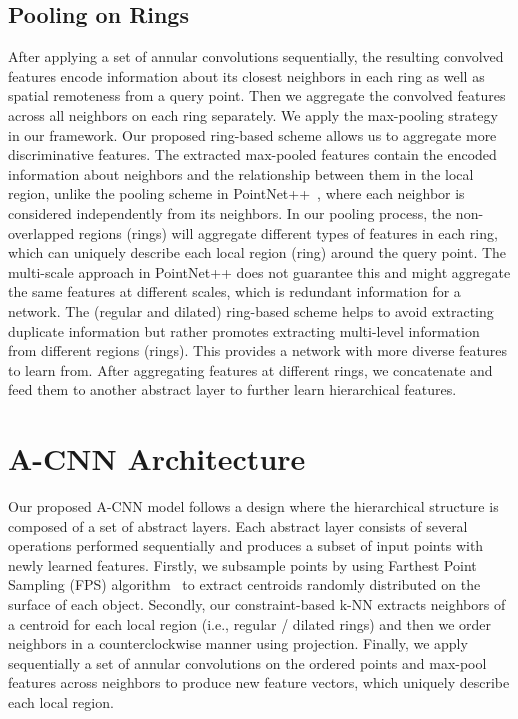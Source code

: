 \documentclass[10pt,twocolumn,letterpaper]{article}
\begin{document}
\subsection{Pooling on Rings}\vspace{-1mm}
After applying a set of annular convolutions sequentially, the resulting convolved features encode information about its closest neighbors in each ring as well as spatial remoteness from a query point. Then we aggregate the convolved features across all neighbors on each ring separately. We apply the max-pooling strategy in our framework. Our proposed ring-based scheme allows us to aggregate more discriminative features. The extracted max-pooled features contain the encoded information about neighbors and the relationship between them in the local region, unlike the pooling scheme in PointNet++~\cite{qi2017pointnet++}, where each neighbor is considered independently from its neighbors. In our pooling process, the non-overlapped regions (rings) will aggregate different types of features in each ring, which can uniquely describe each local region (ring) around the query point. The multi-scale approach in PointNet++ does not guarantee this and might aggregate the same features at different scales, which is redundant information for a network. The (regular and dilated) ring-based scheme helps to avoid extracting duplicate information but rather promotes extracting multi-level information from different regions (rings). This provides a network with more diverse features to learn from. After aggregating features at different rings, we concatenate and feed them to another abstract layer to further learn hierarchical features.
\vspace{-1mm}
\section{A-CNN Architecture}\vspace{-1mm}
Our proposed A-CNN model follows a design where the hierarchical structure is composed of a set of abstract layers. Each abstract layer consists of several operations performed sequentially and produces a subset of input points with newly learned features. Firstly, we subsample points by using Farthest Point Sampling (FPS) algorithm~\cite{moenning2003fast} to extract centroids randomly distributed on the surface of each object. Secondly, our constraint-based k-NN extracts neighbors of a centroid for each local region (i.e., regular / dilated rings) and then we order neighbors in a counterclockwise manner using projection. Finally, we apply sequentially a set of annular convolutions on the ordered points and max-pool features across neighbors to produce new feature vectors, which uniquely describe each local region.
\end{document}
